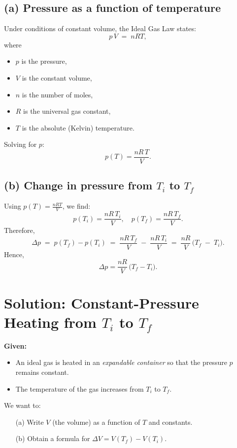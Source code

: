 \documentclass[12pt]{article}
\theoremstyle{definition} %
\theoremstyle{plain} %
\begin{document}
\subsection*{(a) Pressure as a function of temperature}

\noindent
Under conditions of constant volume, the Ideal Gas Law states:
\[
p\,V \;=\; n R T,
\]
where
\begin{itemize}
    \item $p$ is the pressure,
    \item $V$ is the constant volume,
    \item $n$ is the number of moles,
    \item $R$ is the universal gas constant,
    \item $T$ is the absolute (Kelvin) temperature.
\end{itemize}
Solving for $p$:
\[
\boxed{p(T) = \frac{n R \, T}{V}.}
\]

\subsection*{(b) Change in pressure from $T_i$ to $T_f$}

\noindent
Using $p(T) = \tfrac{n R T}{V}$, we find:
\[
p(T_i) = \frac{n R\,T_i}{V},
\quad
p(T_f) = \frac{n R\,T_f}{V}.
\]
Therefore,
\[
\Delta p \;=\; p(T_f) - p(T_i) 
\;=\; \frac{n R\,T_f}{V} \;-\; \frac{n R\,T_i}{V} 
\;=\; \frac{n R}{V}\,\bigl(T_f \;-\; T_i\bigr).
\]
Hence,
\[
\boxed{
\Delta p 
= \frac{n R}{V}\,\bigl(T_f - T_i\bigr).
}
\]

\section*{Solution: Constant-Pressure Heating from $T_i$ to $T_f$}

\noindent
\textbf{Given:}
\begin{itemize}
    \item An ideal gas is heated in an \emph{expandable container} so that the pressure $p$ remains constant.
    \item The temperature of the gas increases from $T_i$ to $T_f$.
\end{itemize}
We want to:
\begin{enumerate}
    \item[(a)] Write $V$ (the volume) as a function of $T$ and constants.
    \item[(b)] Obtain a formula for $\Delta V = V(T_f) - V(T_i)$.
\end{enumerate}
\end{document}
